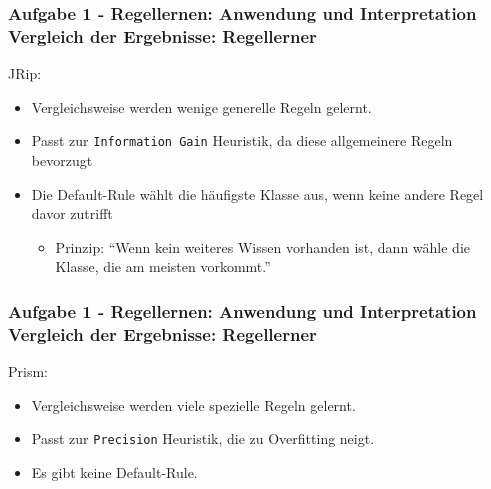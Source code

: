 \documentclass[accentcolor=tud6b,colorbacktitle,inverttitle,landscape,german,presentation,t]{tudbeamer}
\begin{document}
    \begin{frame}[t]
    \frametitle{Aufgabe 1 - Regellernen: Anwendung und Interpretation\\ Vergleich der Ergebnisse: Regellerner}
        JRip:
        \begin{itemize}
            \item Vergleichsweise werden wenige generelle Regeln gelernt.
            \item Passt zur \texttt{Information Gain} Heuristik, da diese allgemeinere Regeln bevorzugt
            \item Die Default-Rule wählt die häufigste Klasse aus, wenn keine andere Regel davor zutrifft
            \begin{itemize}
                \item Prinzip: ``Wenn kein weiteres Wissen vorhanden ist, dann wähle die Klasse, die am meisten vorkommt.''
            \end{itemize}
        \end{itemize}
    \end{frame}
    
    \begin{frame}[t]
    \frametitle{Aufgabe 1 - Regellernen: Anwendung und Interpretation\\ Vergleich der Ergebnisse: Regellerner}
        Prism:
        \begin{itemize}
            \item Vergleichsweise werden viele spezielle Regeln gelernt.
            \item Passt zur \texttt{Precision} Heuristik, die zu Overfitting neigt.
            \item Es gibt keine Default-Rule.
        \end{itemize}
    \end{frame}
    
\end{document}
